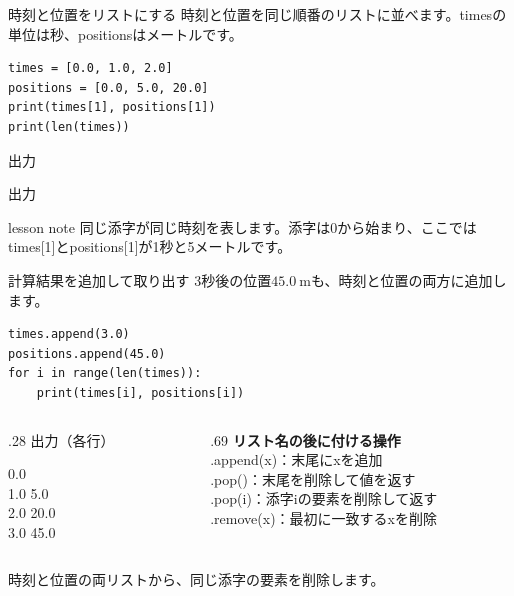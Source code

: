 \documentclass[12pt,aspectratio=43]{beamer}
\newcommand{\code}[1]{{\codefont #1}}
\newcommand{\result}[1]{%
  \par\vspace{1mm}%
  {\small\textcolor{black!60}{出力}}\quad
  {\codefont\fontsize{16}{18}\selectfont #1}\par}
\newenvironment{lessonbox}
  {\begin{beamercolorbox}[wd=\linewidth,sep=1.5mm]{lesson note}}
  {\end{beamercolorbox}\par}
\begin{document}
\begin{frame}[t,fragile]{時刻と位置をリストにする}
  \setlength{\parskip}{0pt}
  時刻と位置を同じ順番のリストに並べます。\code{times}の単位は秒、\code{positions}はメートルです。
\begin{lstlisting}
times = [0.0, 1.0, 2.0]
positions = [0.0, 5.0, 20.0]
print(times[1], positions[1])
print(len(times))
\end{lstlisting}
  \result{1.0}
  \result{3}
  \begin{lessonbox}
    \small 同じ添字が同じ時刻を表します。添字は0から始まり、ここでは\code{times[1]}と\code{positions[1]}が1秒と5メートルです。
  \end{lessonbox}
\end{frame}

\begin{frame}[t,fragile]{計算結果を追加して取り出す}
  \setlength{\parskip}{0pt}
  3秒後の位置\(45.0\ \mathrm{m}\)も、時刻と位置の両方に追加します。
\begin{lstlisting}
times.append(3.0)
positions.append(45.0)
for i in range(len(times)):
    print(times[i], positions[i])
\end{lstlisting}
  \begin{columns}[T,onlytextwidth]
    \begin{column}{.28\textwidth}
      {\small\textcolor{black!60}{出力（各行）}}\\[-1mm]
      {\codefont\fontsize{14}{16} 0.0\\
        1.0 5.0\\
        2.0 20.0\\
        3.0 45.0\par}
    \end{column}
    \begin{column}{.69\textwidth}
      \small
      \textbf{リスト名の後に付ける操作}\\[1mm]
      \code{.append(x)}：末尾に\code{x}を追加\\[1mm]
      \code{.pop()}：末尾を削除して値を返す\\[1mm]
      \code{.pop(i)}：添字\code{i}の要素を削除して返す\\[1mm]
      \code{.remove(x)}：最初に一致する\code{x}を削除
    \end{column}
  \end{columns}
  \vspace{1mm}
  {\small 時刻と位置の両リストから、同じ添字の要素を削除します。}
\end{frame}
\end{document}
